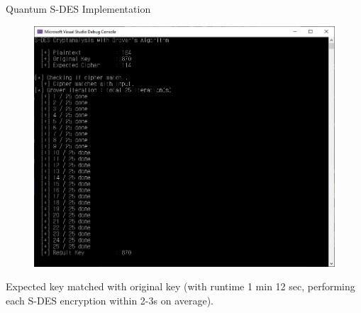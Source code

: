 \documentclass{beamer}
\begin{document}
    \begin{frame}{Quantum S-DES Implementation}
        \begin{figure}
            \centering
            \includegraphics[height=0.5\textheight]{./Images/Qsharp-SDES-Grover-k1.png}
        \end{figure}
        Expected key matched with original key (with runtime 1 min 12 sec, performing each S-DES encryption within 2-3s on average).
    \end{frame}
\end{document}
